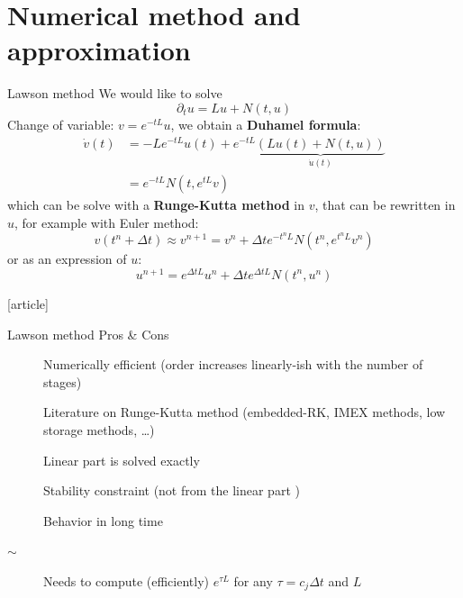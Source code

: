 \documentclass{beamer}
\newcommand{\cmark}{{\color{dgreen}\ding{52}}}
\newcommand{\xmark}{{\color{red}\ding{55}}}
\newcommand{\bmark}{{\color{orange}$\sim$}}
\newcommand{\mbold}[1]{{\textbf{\color{PLB}#1}}}
\newcommand{\customcite}[1]{\cite{#1}}
\begin{document}
\section{Numerical method and approximation}

\begin{frame}{Lawson method}
  We would like to solve
  $$
    \partial_t u = Lu + N(t,u)
  $$
  Change of variable: \mbold{$v = e^{-tL}u$}, we obtain a \mbold{Duhamel formula}:
  $$
    \begin{aligned}
      \dot{v}(t) &= -Le^{-tL}u(t) + e^{-tL}\underbrace{\left(Lu(t) + N(t,u)\right)}_{\dot{u}(t)} \\
                 &= e^{-tL}N(t,e^{tL}v)
    \end{aligned}
  $$
  which can be solve with a \mbold{Runge-Kutta method} in $v$, that can be rewritten in $u$, for example with Euler method:
  $$
    v(t^n+\Delta t) \approx v^{n+1} = v^n + \Delta t e^{-t^nL}N(t^n,e^{t^nL}v^n)
  $$
  or as an expression of $u$:
  $$
    u^{n+1} = e^{\Delta t L}u^n + \Delta te^{\Delta t L}N(t^n,u^n)
  $$
  \begin{thebibliography}{9}
    [article]
     \customcite{Lawson:1967a}
     \customcite{Hochbruck:2020}
  \end{thebibliography}
\end{frame}
\begin{frame}{Lawson method}
  {Pros \& Cons}
  \begin{description}
    \item[\cmark] Numerically efficient (order increases linearly-ish with the number of stages)
    \item[\cmark] Literature on Runge-Kutta method (embedded-RK, IMEX methods, low storage methods, \dots)
    \item[\cmark] Linear part is solved exactly
    \item[\xmark] Stability constraint (not from the linear part \cmark)
    \item[\xmark] Behavior in long time
    \item[\bmark] Needs to compute (efficiently) $e^{\tau L}$ for any $\tau=c_j\Delta t$ and $L$
  \end{description}
\end{frame}
\end{document}
